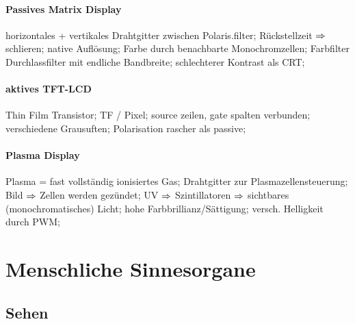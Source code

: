 \documentclass[6pt,a4paper]{scrartcl}
\begin{document}
\begin{multicols*}{4}
{\paragraph{Passives Matrix Display} horizontales + vertikales Drahtgitter zwischen Polaris.filter; Rückstellzeit $\Rightarrow$ schlieren; native Auflösung; Farbe durch benachbarte Monochromzellen; Farbfilter Durchlassfilter mit endliche Bandbreite; schlechterer Kontrast als CRT; 

\paragraph{aktives TFT-LCD}Thin Film Transistor; TF / Pixel; source zeilen, gate spalten verbunden; verschiedene Grausuften; Polarisation rascher als passive; 

\paragraph{Plasma Display} Plasma = fast vollständig ionisiertes Gas; Drahtgitter zur Plasmazellensteuerung; Bild $\Rightarrow$ Zellen werden gezündet; UV $\Rightarrow$ Szintillatoren $\Rightarrow$ sichtbares (monochromatisches) Licht; hohe Farbbrillianz/Sättigung; versch. Helligkeit durch PWM; 
}



\section{Menschliche Sinnesorgane}

\subsection{Sehen}

\end{multicols*}
\end{document}
